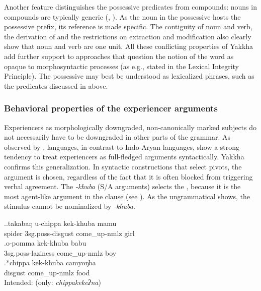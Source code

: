 Another feature distinguishes the possessive  predicates from compounds: nouns in compounds are typically generic (\citealt[66]{Fabb2001Compounding}, \citealt[156]{Haspelmath2002Understanding}). As the noun in the possessive  hosts the possessive prefix, its reference is made specific. The contiguity of noun and verb, the derivation of  and the restrictions on extraction and modification also clearly show that noun and verb are one unit. All these conflicting properties of Yakkha add further support to approaches that question the notion of the word as opaque to morphosyntactic processes (as e.g., stated in the Lexical Integrity Principle). The possessive  may best be understood as lexicalized phrases, such as  the predicates discussed in  above.  


\subsubsection{Behavioral properties of the experiencer arguments}\label{poss-e4}

Experiencers as morphologically downgraded, non-canonically marked subjects do not necessarily have to be downgraded in other parts of the grammar. As observed  by \citet{Bickel2004The-syntax},  languages, in contrast to Indo-Aryan languages, show a strong tendency to treat  experiencers as full-fledged arguments  syntactically. Yakkha confirms this generalization. In syntactic constructions that select pivots, the  argument is chosen, regardless of the fact that  it is often blocked from triggering verbal agreement. The  \emph{-khuba} (S/A arguments) selects the , because it is the most agent-like argument in the clause (see \Next). As the ungrammatical \Next[c] shows, the stimulus cannot be nominalized by \emph{-khuba}.


 \ex.\ag.takabaŋ u-chippa kek-khuba mamu\\
spider {\sc 3sg.poss-}disgust come\_up{\sc -nmlz} girl\\
\bg.o-pomma kek-khuba babu\\
{\sc 3sg.poss-}laziness come\_up{\sc -nmlz} boy\\
\bg.*chippa kek-khuba camyoŋba \\
disgust come\_up{\sc -nmlz} food \\
Intended:  (only: \emph{chippakekeʔna})

